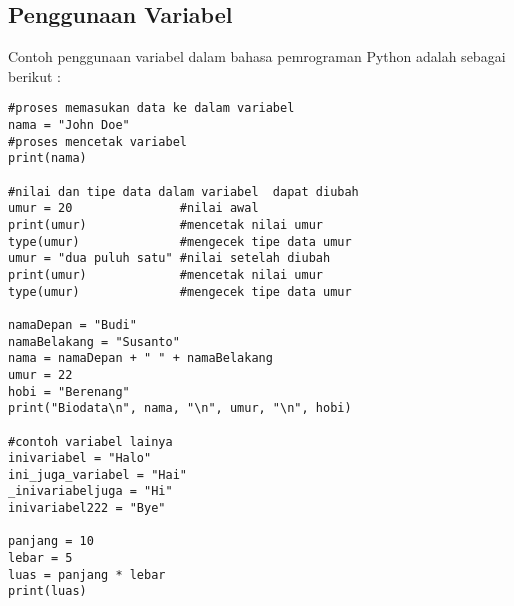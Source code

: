 \subsection{Penggunaan Variabel}
Contoh penggunaan variabel  dalam bahasa pemrograman Python adalah sebagai berikut :

\begin{verbatim}
#proses memasukan data ke dalam variabel
nama = "John Doe"
#proses mencetak variabel
print(nama)

#nilai dan tipe data dalam variabel  dapat diubah
umur = 20               #nilai awal
print(umur)             #mencetak nilai umur
type(umur)              #mengecek tipe data umur
umur = "dua puluh satu" #nilai setelah diubah
print(umur)             #mencetak nilai umur
type(umur)              #mengecek tipe data umur

namaDepan = "Budi"
namaBelakang = "Susanto"
nama = namaDepan + " " + namaBelakang
umur = 22
hobi = "Berenang"
print("Biodata\n", nama, "\n", umur, "\n", hobi)

#contoh variabel lainya
inivariabel = "Halo"
ini_juga_variabel = "Hai"
_inivariabeljuga = "Hi"
inivariabel222 = "Bye" 

panjang = 10
lebar = 5
luas = panjang * lebar
print(luas)
\end{verbatim}

